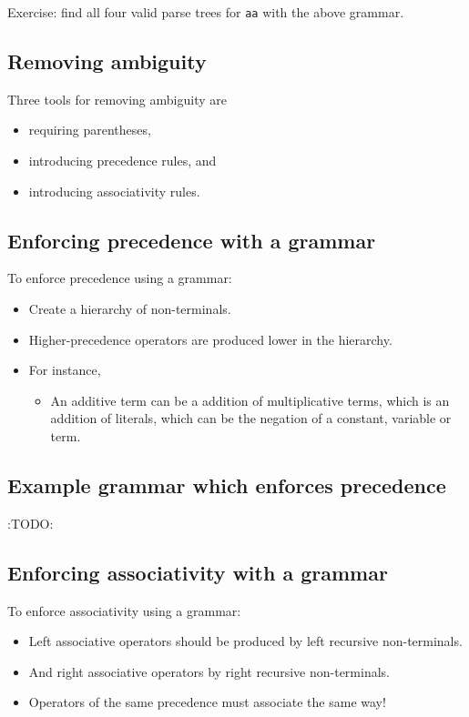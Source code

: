 \documentclass[11pt]{article}
\theoremstyle{definition}
\begin{document}
Exercise: find all four valid parse trees for \texttt{aa} with the above
grammar.

\subsection{Removing ambiguity}
\label{sec:org4da1fdc}
Three tools for removing ambiguity are
\begin{itemize}
\item requiring parentheses,
\item introducing precedence rules, and
\item introducing associativity rules.
\end{itemize}

\subsection{Enforcing precedence with a grammar}
\label{sec:org651e7eb}
To enforce precedence using a grammar:
\begin{itemize}
\item Create a hierarchy of non-terminals.
\item Higher-precedence operators are produced lower in the hierarchy.
\item For instance,
\begin{itemize}
\item An additive term can be a addition of multiplicative terms,
which is an addition of literals, which can be the negation
of a constant, variable or term.
\end{itemize}
\end{itemize}

\subsection{Example grammar which enforces precedence}
\label{sec:orgf0d562b}
:TODO:

\subsection{Enforcing associativity with a grammar}
\label{sec:orgea0f71c}
To enforce associativity using a grammar:
\begin{itemize}
\item Left associative operators should be produced by left recursive
non-terminals.
\item And right associative operators by right recursive non-terminals.
\item Operators of the same precedence must associate the same way!
\end{itemize}
\end{document}
